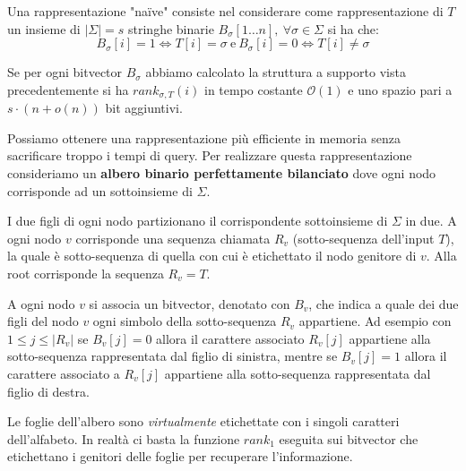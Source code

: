 Una rappresentazione "naïve" consiste nel considerare come rappresentazione di $T$ un insieme di $| \Sigma | = s$ stringhe binarie $B_\sigma[1\dots n], \ \forall \sigma \in \Sigma$ si ha che:
\begin{equation}
    B_\sigma[i] = 1 \iff T[i] = \sigma \ \text{e} \ B_\sigma[i] = 0  \iff T[i] \neq \sigma
\end{equation}

Se per ogni bitvector $B_\sigma$ abbiamo calcolato la struttura a supporto vista precedentemente si ha $rank_{\sigma,T} (i)$ in tempo costante $\mathcal{O}(1)$ e uno spazio pari a $s \cdot (n + o(n))$ bit aggiuntivi.

Possiamo ottenere una rappresentazione più efficiente in memoria senza sacrificare troppo i tempi di query. Per realizzare questa rappresentazione consideriamo un \textbf{albero binario perfettamente bilanciato} dove ogni nodo corrisponde ad un sottoinsieme di $\Sigma$. 

I due figli di ogni nodo partizionano il corrispondente sottoinsieme di $\Sigma$ in due. A ogni nodo $v$ corrisponde una sequenza chiamata $R_v$ (sotto-sequenza dell'input $T$), la quale è sotto-sequenza di quella con cui è etichettato il nodo genitore di $v$. Alla root corrisponde la sequenza $R_v = T$.

A ogni nodo $v$ si associa un bitvector, denotato con $B_v$, che indica a quale dei due figli del nodo $v$ ogni simbolo della sotto-sequenza $R_v$ appartiene. Ad esempio con $1 \leq j \leq |R_v|$ se $B_v [j] = 0$ allora il carattere associato $R_v [j]$ appartiene alla sotto-sequenza rappresentata dal figlio di sinistra, mentre se $B_v [j] = 1$ allora il carattere associato a $R_v [j]$ appartiene alla sotto-sequenza rappresentata dal figlio di destra.

Le foglie dell'albero sono \textit{virtualmente} etichettate con i singoli caratteri dell'alfabeto. In realtà ci basta la funzione $rank_1$ eseguita sui bitvector che etichettano i genitori delle foglie per recuperare l'informazione.

